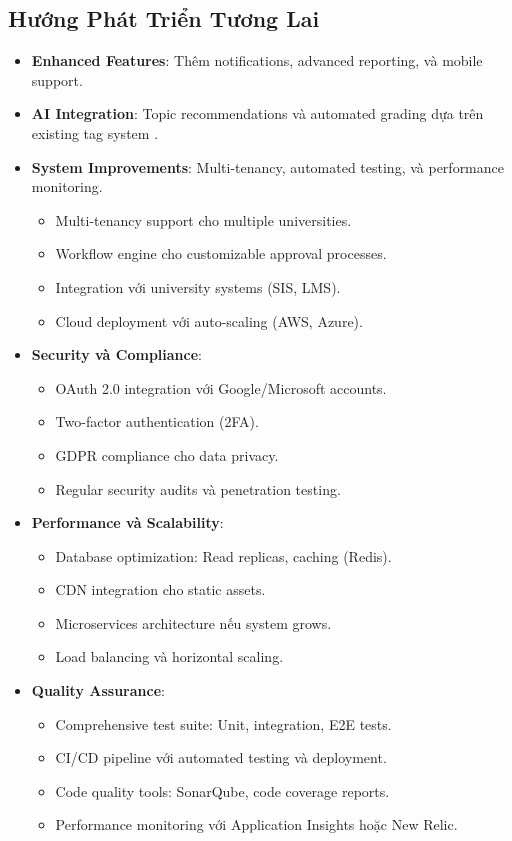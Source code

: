 \documentclass[conference,a4paper]{IEEEtran}
\begin{document}
\subsection{Hướng Phát Triển Tương Lai}
\begin{itemize}
  \item \textbf{Enhanced Features}: Thêm notifications, advanced reporting, và mobile support.
  \item \textbf{AI Integration}: Topic recommendations và automated grading dựa trên existing tag system \cite{kumar2023ai}.
  \item \textbf{System Improvements}: Multi-tenancy, automated testing, và performance monitoring.
  \begin{itemize}
    \item Multi-tenancy support cho multiple universities.
    \item Workflow engine cho customizable approval processes.
    \item Integration với university systems (SIS, LMS).
    \item Cloud deployment với auto-scaling (AWS, Azure).
  \end{itemize}
  
  \item \textbf{Security và Compliance}:
  \begin{itemize}
    \item OAuth 2.0 integration với Google/Microsoft accounts.
    \item Two-factor authentication (2FA).
    \item GDPR compliance cho data privacy.
    \item Regular security audits và penetration testing.
  \end{itemize}
  
  \item \textbf{Performance và Scalability}:
  \begin{itemize}
    \item Database optimization: Read replicas, caching (Redis).
    \item CDN integration cho static assets.
    \item Microservices architecture nếu system grows.
    \item Load balancing và horizontal scaling.
  \end{itemize}
  
  \item \textbf{Quality Assurance}:
  \begin{itemize}
    \item Comprehensive test suite: Unit, integration, E2E tests.
    \item CI/CD pipeline với automated testing và deployment.
    \item Code quality tools: SonarQube, code coverage reports.
    \item Performance monitoring với Application Insights hoặc New Relic.
  \end{itemize}
\end{itemize}
\end{document}
